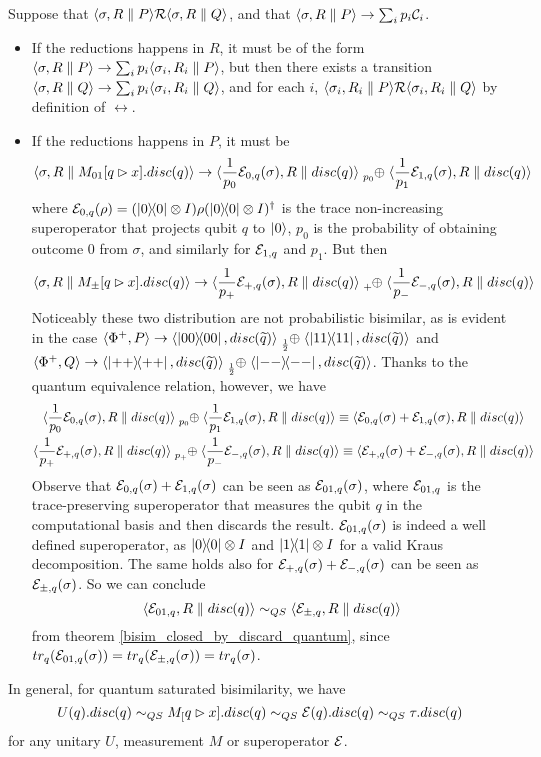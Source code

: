 Suppose that $\langle\sigma, R \parallel P\rangle \mathcal{R} \langle\sigma, R \parallel Q\rangle$, and that $\langle\sigma, R \parallel P\rangle \rightarrow \sum_i p_i \mathcal{C}_i$.\begin{itemize}
\item If the reductions happens in $R$, it must be of the form $\langle\sigma, R \parallel P\rangle \rightarrow \sum_i p_i \langle\sigma_i, R_i \parallel P\rangle$, but then there exists a transition $\langle\sigma, R \parallel Q\rangle \rightarrow \sum_i p_i \langle\sigma_i, R_i \parallel Q\rangle$, and for each $i$, $\langle\sigma_i, R_i \parallel P\rangle \mathcal{R} \langle\sigma_i, R_i \parallel Q\rangle$ by definition of $\rel$.
\item If the reductions happens in $P$, it must be 
 \[\confw{\sigma, R \parallel M_{01}[q \rhd x].disc(q)} \rightarrow \confw{\frac{1}{p_0}\sop_{0, q}(\sigma), R \parallel disc(q)} \psum{p_0} \confw{\frac{1}{p_1}\sop_{1, q}(\sigma), R \parallel disc(q)}\]
 where $\mathcal{E}_{0, q}(\rho) = (\ket{0}\!\!\bra{0}\otimes I) \rho (\ket{0}\!\!\bra{0} \otimes I)^\dagger$ is the trace non-increasing superoperator that projects qubit $q$ to $\ket{0}$, $p_0$ is the probability of obtaining outcome $0$ from $\sigma$, and similarly for $\mathcal{E}_{1, q }$ and $p_1$. But then  
 \[\confw{\sigma, R \parallel M_\pm[q \rhd x].disc(q)} \rightarrow \confw{\frac{1}{p_+}\sop_{+, q}(\sigma), R \parallel disc(q)} \psum{+} \confw{\frac{1}{p_-}\sop_{-, q}(\sigma), R \parallel disc(q)}
 \] 
 Noticeably these two distribution are not probabilistic bisimilar, as is evident in the case $\confw{\Phi^+, P} \rightarrow \confw{\proj{00}, \discQ} \psum{\frac{1}{2}} \confw{\proj{11}, \discQ}$ and $\confw{\Phi^+, Q} \rightarrow \confw{\proj{++}, \discQ} \psum{\frac{1}{2}} \confw{\proj{--}, \discQ}$.  Thanks to the quantum equivalence relation, however, we have 
 \begin{gather*}
 \confw{\frac{1}{p_0}\sop_{0, q}(\sigma), R \parallel disc(q)} \psum{p_0} \confw{\frac{1}{p_1}\sop_{1, q}(\sigma), R \parallel disc(q)} \equiv \confw{\sop_{0, q}(\sigma) + \sop_{1, q}(\sigma), R \parallel disc(q)}
 \\
 \confw{\frac{1}{p_+}\sop_{+, q}(\sigma), R \parallel disc(q)} \psum{p_+} \confw{\frac{1}{p_-}\sop_{-, q}(\sigma), R \parallel disc(q)} \equiv \confw{\sop_{+, q}(\sigma) + \sop_{-, q}(\sigma), R \parallel disc(q)}
 \end{gather*}
 Observe that $\mathcal{E}_{0, q}(\sigma) + \mathcal{E}_{1, q}(\sigma)$ can be seen as $\mathcal{E}_{01, q}(\sigma)$, where $\mathcal{E}_{01, q}$ is the trace-preserving superoperator that measures the qubit $q$ in the computational basis and then discards the result. $\mathcal{E}_{01, q}(\sigma)$ is indeed a well defined superoperator, as $\ket{0}\!\!\bra{0}\otimes I$ and $\ket{1}\!\!\bra{1}\otimes I$ for a valid Kraus decomposition. The same holds also for $\mathcal{E}_{+, q}(\sigma) + \mathcal{E}_{-, q}(\sigma)$ can be seen as $\mathcal{E}_{\pm, q}(\sigma)$. So we can conclude
 \[ \langle\mathcal{E}_{01,q},  R \parallel disc(q)\rangle \sim_{QS} \langle\mathcal{E}_{\pm,q},  R \parallel disc(q)\rangle
 \]
 from theorem \ref{bisim_closed_by_discard_quantum}, since $tr_q(\mathcal{E}_{01, q}(\sigma)) = tr_q(\mathcal{E}_{\pm, q}(\sigma)) = tr_q(\sigma)$.
\end{itemize}

In general, for quantum saturated bisimilarity, we have
\[	U(q).disc(q) \sim_{QS} M_[q \rhd x].disc(q) \sim_{QS} \mathcal{E}(q).disc(q) \sim_{QS} \tau.disc(q) \]
for any unitary $U$, measurement $M$ or superoperator $\mathcal{E}$.


